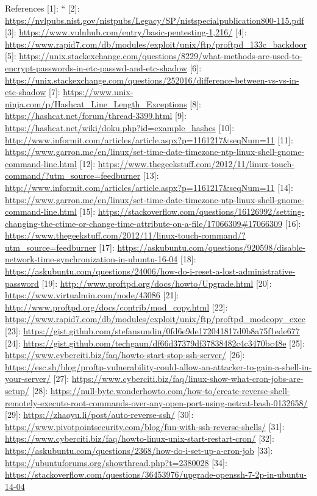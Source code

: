 References
[1]:  ``
[2]: \url{https://nvlpubs.nist.gov/nistpubs/Legacy/SP/nistspecialpublication800-115.pdf}
[3]: \url{https://www.vulnhub.com/entry/basic-pentesting-1,216/}
[4]: \url{https://www.rapid7.com/db/modules/exploit/unix/ftp/proftpd_133c_backdoor}
[5]: \url{https://unix.stackexchange.com/questions/8229/what-methods-are-used-to-encrypt-passwords-in-etc-passwd-and-etc-shadow}
[6]: \url{https://unix.stackexchange.com/questions/252016/difference-between-vs-vs-in-etc-shadow}
[7]: \url{https://www.unix-ninja.com/p/Hashcat_Line_Length_Exceptions}
[8]: \url{https://hashcat.net/forum/thread-3399.html}
[9]: \url{https://hashcat.net/wiki/doku.php?id=example_hashes}
[10]: \url{http://www.informit.com/articles/article.aspx?p=1161217&seqNum=11}
[11]: \url{https://www.garron.me/en/linux/set-time-date-timezone-ntp-linux-shell-gnome-command-line.html}
[12]: \url{https://www.thegeekstuff.com/2012/11/linux-touch-command/?utm_source=feedburner}
[13]: \url{http://www.informit.com/articles/article.aspx?p=1161217&seqNum=11}
[14]: \url{https://www.garron.me/en/linux/set-time-date-timezone-ntp-linux-shell-gnome-command-line.html}
[15]: \url{https://stackoverflow.com/questions/16126992/setting-changing-the-ctime-or-change-time-attribute-on-a-file/17066309\#17066309}
[16]: \url{https://www.thegeekstuff.com/2012/11/linux-touch-command/?utm_source=feedburner}
[17]: \url{https://askubuntu.com/questions/920598/disable-network-time-synchronization-in-ubuntu-16-04}
[18]: \url{https://askubuntu.com/questions/24006/how-do-i-reset-a-lost-administrative-password}
[19]: \url{http://www.proftpd.org/docs/howto/Upgrade.html}
[20]: \url{https://www.virtualmin.com/node/43086}
[21]: \url{http://www.proftpd.org/docs/contrib/mod_copy.html}
[22]: \url{https://www.rapid7.com/db/modules/exploit/unix/ftp/proftpd_modcopy_exec}
[23]: \url{https://gist.github.com/stefansundin/0fd6e9de172041817d0b8a75f1ede677}
[24]: \url{https://gist.github.com/techgaun/df66d37379df37838482c4c3470bc48e}
[25]: \url{https://www.cyberciti.biz/faq/howto-start-stop-ssh-server/}
[26]: \url{https://esc.sh/blog/proftp-vulnerability-could-allow-an-attacker-to-gain-a-shell-in-your-server/}
[27]: \url{https://www.cyberciti.biz/faq/linux-show-what-cron-jobs-are-setup/}
[28]: \url{https://null-byte.wonderhowto.com/how-to/create-reverse-shell-remotely-execute-root-commands-over-any-open-port-using-netcat-bash-0132658/}
[29]: \url{https://zhaoyu.li/post/auto-reverse-ssh/}
[30]: \url{https://www.pivotpointsecurity.com/blog/fun-with-ssh-reverse-shells/}
[31]: \url{https://www.cyberciti.biz/faq/howto-linux-unix-start-restart-cron/}
[32]: \url{https://askubuntu.com/questions/2368/how-do-i-set-up-a-cron-job}
[33]: \url{https://ubuntuforums.org/showthread.php?t=2380028}
[34]: \url{https://stackoverflow.com/questions/36453976/upgrade-openssh-7-2p-in-ubuntu-14-04}


\markchapterendnotes
